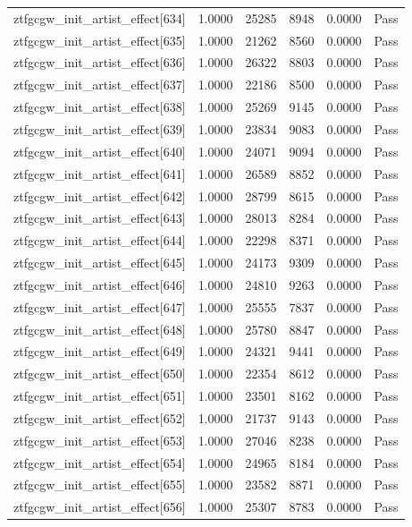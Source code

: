 \begin{table}[htbp]
\begin{tabular}{llrrll}
ztfgcgw\_init\_artist\_effect[634] & 1.0000 & 25285 & 8948 & 0.0000 & Pass \\
ztfgcgw\_init\_artist\_effect[635] & 1.0000 & 21262 & 8560 & 0.0000 & Pass \\
ztfgcgw\_init\_artist\_effect[636] & 1.0000 & 26322 & 8803 & 0.0000 & Pass \\
ztfgcgw\_init\_artist\_effect[637] & 1.0000 & 22186 & 8500 & 0.0000 & Pass \\
ztfgcgw\_init\_artist\_effect[638] & 1.0000 & 25269 & 9145 & 0.0000 & Pass \\
ztfgcgw\_init\_artist\_effect[639] & 1.0000 & 23834 & 9083 & 0.0000 & Pass \\
ztfgcgw\_init\_artist\_effect[640] & 1.0000 & 24071 & 9094 & 0.0000 & Pass \\
ztfgcgw\_init\_artist\_effect[641] & 1.0000 & 26589 & 8852 & 0.0000 & Pass \\
ztfgcgw\_init\_artist\_effect[642] & 1.0000 & 28799 & 8615 & 0.0000 & Pass \\
ztfgcgw\_init\_artist\_effect[643] & 1.0000 & 28013 & 8284 & 0.0000 & Pass \\
ztfgcgw\_init\_artist\_effect[644] & 1.0000 & 22298 & 8371 & 0.0000 & Pass \\
ztfgcgw\_init\_artist\_effect[645] & 1.0000 & 24173 & 9309 & 0.0000 & Pass \\
ztfgcgw\_init\_artist\_effect[646] & 1.0000 & 24810 & 9263 & 0.0000 & Pass \\
ztfgcgw\_init\_artist\_effect[647] & 1.0000 & 25555 & 7837 & 0.0000 & Pass \\
ztfgcgw\_init\_artist\_effect[648] & 1.0000 & 25780 & 8847 & 0.0000 & Pass \\
ztfgcgw\_init\_artist\_effect[649] & 1.0000 & 24321 & 9441 & 0.0000 & Pass \\
ztfgcgw\_init\_artist\_effect[650] & 1.0000 & 22354 & 8612 & 0.0000 & Pass \\
ztfgcgw\_init\_artist\_effect[651] & 1.0000 & 23501 & 8162 & 0.0000 & Pass \\
ztfgcgw\_init\_artist\_effect[652] & 1.0000 & 21737 & 9143 & 0.0000 & Pass \\
ztfgcgw\_init\_artist\_effect[653] & 1.0000 & 27046 & 8238 & 0.0000 & Pass \\
ztfgcgw\_init\_artist\_effect[654] & 1.0000 & 24965 & 8184 & 0.0000 & Pass \\
ztfgcgw\_init\_artist\_effect[655] & 1.0000 & 23582 & 8871 & 0.0000 & Pass \\
ztfgcgw\_init\_artist\_effect[656] & 1.0000 & 25307 & 8783 & 0.0000 & Pass \\

\end{tabular}
\end{table}

